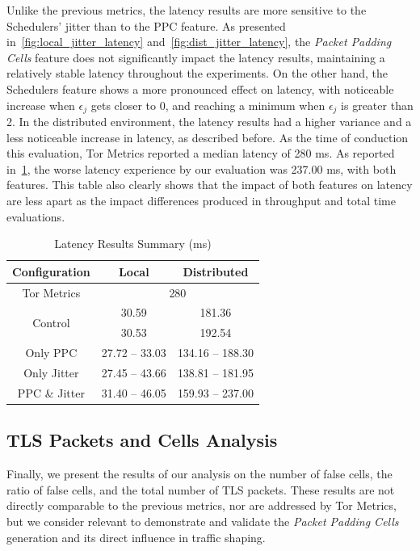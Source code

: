 Unlike the previous metrics, the latency results are more sensitive to the Schedulers' jitter than to the PPC feature. As presented in~\cref{fig:local_jitter_latency} and~\cref{fig:dist_jitter_latency}, the \textit{Packet Padding Cells} feature does not significantly impact the latency results, maintaining a relatively stable latency throughout the experiments. On the other hand, the Schedulers feature shows a more pronounced effect on latency, with noticeable increase when $\epsilon_j$ gets closer to 0, and reaching a minimum when $\epsilon_j$ is greater than 2. In the distributed environment, the latency results had a higher variance and a less noticeable increase in latency, as described before.
As the time of conduction this evaluation, Tor Metrics reported a median latency of 280 ms. As reported in~\cref{tab:latency_summary}, the worse latency experience by our evaluation was 237.00 ms, with both features. This table also clearly shows that the impact of both features on latency are less apart as the impact differences produced in throughput and total time evaluations. 
\begin{table}[htbp]
    \centering
    \begin{tabular}{|c|c|c|}
    \hline
    \textbf{Configuration} & \textbf{Local} & \textbf{Distributed}\\
    \hline
    Tor Metrics & \multicolumn{2}{c|}{280}  \\ 
    \hline
    \multirow{2}{*}{Control} & 30.59 & 181.36 \\ 
    & 30.53 & 192.54\\
    \hline
    Only PPC & 27.72 – 33.03 & 134.16 – 188.30\\
    \hline
    Only Jitter & 27.45 – 43.66 & 138.81 – 181.95 \\
    \hline
    PPC \& Jitter & 31.40 – 46.05 & 159.93 – 237.00\\
    \hline
    \end{tabular}
    \caption{Latency Results Summary (ms)}\label{tab:latency_summary}
\end{table}

\FloatBarrier
\subsection{TLS Packets and Cells Analysis}

Finally, we present the results of our analysis on the number of false cells, the ratio of false cells, and the total number of TLS packets. These results are not directly comparable to the previous metrics, nor are addressed by Tor Metrics, but we consider relevant to demonstrate and validate the \textit{Packet Padding Cells} generation and its direct influence in traffic shaping.

